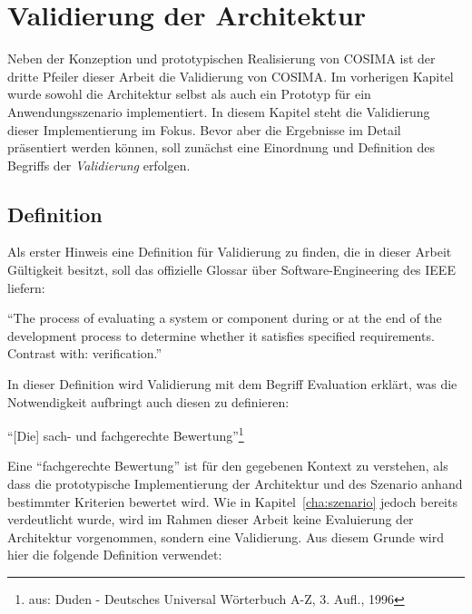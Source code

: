
\chapter{Validierung der Architektur} %
\label{cha:validierung_der_architektur}

  Neben der Konzeption und prototypischen Realisierung von COSIMA ist der dritte Pfeiler dieser Arbeit die Validierung von COSIMA. Im vorherigen Kapitel wurde sowohl die Architektur selbst als auch ein Prototyp für ein Anwendungsszenario implementiert. In diesem Kapitel steht die Validierung dieser Implementierung im Fokus. Bevor aber die Ergebnisse im Detail präsentiert werden können, soll zunächst eine Einordnung und Definition des Begriffs der \emph{Validierung} erfolgen.

\section{Definition} %
\label{sec:definition_validierung}
  
  Als erster Hinweis eine Definition für Validierung zu finden, die in dieser Arbeit Gültigkeit besitzt, soll das offizielle Glossar über Software-Engineering des IEEE liefern:

  \begin{definition}\label{def:validierung_ieee}
    "`The process of evaluating a system or component during or at the end of the development process to determine whether it satisfies specified requirements. Contrast with: verification."' \emph{\citep{ieee90sg}}
  \end{definition}
  
  In dieser Definition wird Validierung mit dem Begriff Evaluation erklärt, was die Notwendigkeit aufbringt auch diesen zu definieren:
  
  \begin{definition}[Evaluation]\label{def:evaluation}
    "`[Die] sach- und fachgerechte Bewertung"'\footnote{aus: Duden - Deutsches Universal Wörterbuch A-Z, 3. Aufl., 1996}
  \end{definition}
  
  Eine "`fachgerechte Bewertung"' ist für den gegebenen Kontext zu verstehen, als dass die prototypische Implementierung der Architektur und des Szenario anhand bestimmter Kriterien bewertet wird. Wie in Kapitel~\ref{cha:szenario} jedoch bereits verdeutlicht wurde, wird im Rahmen dieser Arbeit keine Evaluierung der Architektur vorgenommen, sondern eine Validierung. Aus diesem Grunde wird hier die folgende Definition verwendet:
  
